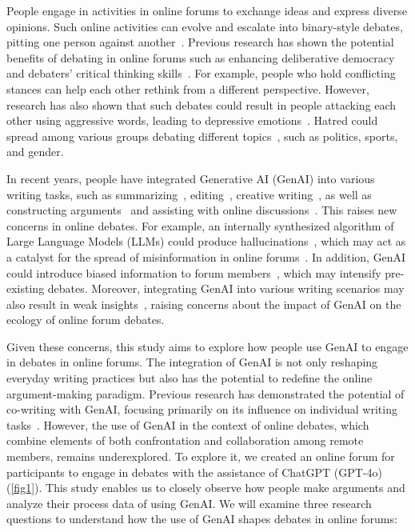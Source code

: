 People engage in activities in online forums to exchange ideas and express diverse opinions. Such online activities can evolve and escalate into binary-style debates, pitting one person against another~\cite{sridhar_joint_2015}. Previous research has shown the potential benefits of debating in online forums such as enhancing deliberative democracy~\cite{habermas_theory_1984, semaan_designing_2015, baughan_someone_2021} and debaters' critical thinking skills~\cite{walton_dialogue_1989, tanprasert_debate_2024}. For example, people who hold conflicting stances can help each other rethink from a different perspective. However, research has also shown that such debates could result in people attacking each other using aggressive words, leading to depressive emotions~\cite{shuv-ami_new_2022}. Hatred could spread among various groups debating different topics~\cite{iandoli_impact_2021, nasim_investigating_2023, vasconcellos_analyzing_2023, qin_dismantling_2024}, such as politics, sports, and gender.

In recent years, people have integrated Generative AI (GenAI) into various writing tasks, such as summarizing~\cite{august_know_2024}, editing~\cite{li_value_2024}, creative writing~\cite{chakrabarty_help_2022, li_value_2024, yang_ai_2022, yuan_wordcraft_2022}, as well as constructing arguments~\cite{jakesch_co-writing_2023, li_value_2024} and assisting with online discussions~\cite{lin_case_2024}. This raises new concerns in online debates. For example, an internally synthesized algorithm of Large Language Models (LLMs) could produce hallucinations~\cite{fischer_generative_2023, razi_not_2024}, which may act as a catalyst for the spread of misinformation in online forums~\cite{fischer_generative_2023}. In addition, GenAI could introduce biased information to forum members~\cite{razi_not_2024}, which may intensify pre-existing debates. Moreover, integrating GenAI into various writing scenarios may also result in weak insights~\cite{hadan_great_2024}, raising concerns about the impact of GenAI on the ecology of online forum debates.

Given these concerns, this study aims to explore how people use GenAI to engage in debates in online forums. The integration of GenAI is not only reshaping everyday writing practices but also has the potential to redefine the online argument-making paradigm. Previous research has demonstrated the potential of co-writing with GenAI, focusing primarily on its influence on individual writing tasks~\cite{august_know_2024, chakrabarty_help_2022, jakesch_co-writing_2023, li_value_2024, yang_ai_2022}. However, the use of GenAI in the context of online debates, which combine elements of both confrontation and collaboration among remote members, remains underexplored. To explore it, we created an online forum for participants to engage in debates with the assistance of ChatGPT (GPT-4o) (\autoref{fig1}). This study enables us to closely observe how people make arguments and analyze their process data of using GenAI. We will examine three research questions to understand how the use of GenAI shapes debates in online forums: 

